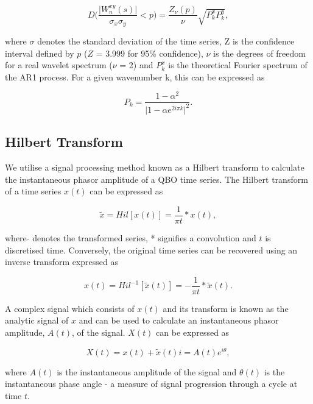 \documentclass[wcd, manuscript]{copernicus}
\begin{document}
\begin{equation} \label{wavelet_cross_dist}
D\bigg(\frac{\vert W^{xy}_n(s)\vert}{\sigma_x \sigma_y} < p\bigg) = \frac{Z_\nu(p)}{\nu} \sqrt{P^x_k P^y_k},
\end{equation}

where $\sigma$ denotes the standard deviation of the time series, Z is the confidence interval defined by $p$ ($Z$ = 3.999 for 95\% confidence), $\nu$ is the degrees of freedom for a real wavelet spectrum ($\nu$ = 2) and $P^x_k$ is the theoretical Fourier spectrum of the AR1 process. For a given wavenumber k, this can be expressed as

\begin{equation} \label{theoretical_fourier}
P_k = \frac{1 - \alpha^2}{\vert 1 - \alpha e^{2i\pi k} \vert^2}.
\end{equation}

\subsection{Hilbert Transform}
We utilise a signal processing method known as a Hilbert transform to calculate the instantaneous phasor amplitude of a QBO time series. The Hilbert transform of a time series $x(t)$ can be expressed as

\begin{equation} \label{theoretical_fourier}
\tilde{x} = Hil[x(t)] = \frac{1}{\pi t} * x(t),
\end{equation}

where $\tilde{}$ denotes the transformed series, * signifies a convolution and $t$ is discretised time. Conversely, the original time series can be recovered using an inverse transform expressed as

\begin{equation} \label{theoretical_fourier}
{x(t)} = Hil^{-1}[\tilde{x}(t)] = -\frac{1}{\pi t} * \tilde{x}(t).
\end{equation}

A complex signal which consists of $x(t)$ and its transform is known as the analytic signal of $x$ and can be used to calculate an instantaneous phasor amplitude, $A(t)$, of the signal. $X(t)$ can be expressed as

\begin{equation} \label{theoretical_fourier}
X(t) = x(t) + \tilde{x}(t) i = A(t) e^{i\theta},
\end{equation}

where $A(t)$ is the instantaneous amplitude of the signal and $\theta(t)$ is the instantaneous phase angle - a measure of signal progression through a cycle at time $t$.
\end{document}
